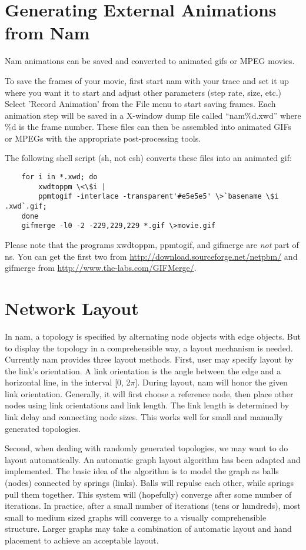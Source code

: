 \section{Generating External Animations from Nam}
\label{sec:exteranlanimations}

Nam animations can be saved and converted to animated gifs or MPEG movies.

To save the frames of your movie, first start nam with your trace and set it up where you want it to start and adjust other parameters (step rate, size, etc.) Select 'Record Animation' from the File menu to start saving frames.  Each animation step will be saved in a X-window dump file called ``nam\%d.xwd'' where \%d is the frame number. These files can then be assembled into animated GIFs or MPEGs with the appropriate post-processing tools.

The following shell script (sh, not csh) converts these files into an animated gif:
\begin{verbatim}
    for i in *.xwd; do
    	xwdtoppm \<\$i |
    	ppmtogif -interlace -transparent'#e5e5e5' \>`basename \$i .xwd`.gif;
    done
    gifmerge -l0 -2 -229,229,229 *.gif \>movie.gif
\end{verbatim}

Please note that the programs xwdtoppm, ppmtogif, and gifmerge are \emph{not} part of ns.
You can get the first two from
\url{http://download.sourceforge.net/netpbm/}
and gifmerge from
\url{http://www.the-labs.com/GIFMerge/}.


\section{Network Layout}
\label{sec:networklayout}

In nam, a topology is specified by alternating node objects with edge objects. But to display the topology in a comprehensible way, a layout mechanism is needed. Currently nam provides three layout methods. First, user may specify layout by the link's orientation. A link orientation is the angle between the edge and a horizontal line, in the interval [0, 2$\pi$]. During layout, nam will honor the given link orientation. Generally, it will first choose a reference node, then place other nodes using link orientations and link length.  The link length is determined by link delay and connecting node sizes. This works well for small and manually generated topologies.

Second, when dealing with randomly generated topologies, we may want to do layout automatically. An automatic graph layout algorithm has been adapted and implemented. The basic idea of the algorithm is to model the graph as balls (nodes) connected by springs (links). Balls will repulse each other, while springs pull them together. This system will (hopefully) converge after some number of iterations. In practice, after a small number of iterations (tens or hundreds), most small to medium sized graphs will converge to a visually comprehensible structure. Larger graphs may take a combination of automatic layout and hand placement to achieve an acceptable layout. 

